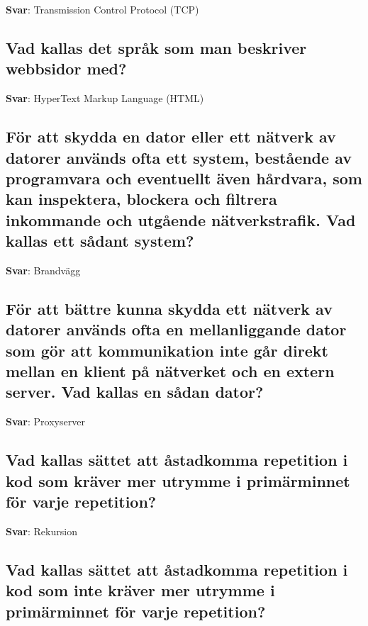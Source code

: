 \documentclass[a4paper,11pt,oneside]{article}
\begin{document}
\begin{sloppypar}
\label{q:26:sa:sv:True}

\textbf{Svar}: Transmission Control Protocol (TCP)



\subsection{Vad kallas det spr\r{a}k som man beskriver webbsidor med?}

\label{q:27:sa:sv:True}

\textbf{Svar}: HyperText Markup Language (HTML)



\subsection{F\"or att skydda en dator eller ett n\"atverk av datorer anv\"ands ofta ett system, best\r{a}ende av programvara och eventuellt \"aven h\r{a}rdvara, som kan inspektera, blockera och filtrera inkommande och utg\r{a}ende n\"atverkstrafik. Vad kallas ett s\r{a}dant system?}

\label{q:28:sa:sv:True}

\textbf{Svar}: Brandv\"agg



\subsection{F\"or att b\"attre kunna skydda ett n\"atverk av datorer anv\"ands ofta en mellanliggande dator som g\"or att kommunikation inte g\r{a}r direkt mellan en klient p\r{a} n\"atverket och en extern server. Vad kallas en s\r{a}dan dator?}

\label{q:29:sa:sv:True}

\textbf{Svar}: Proxyserver



\subsection{Vad kallas s\"attet att \r{a}stadkomma repetition i kod som kr\"aver mer utrymme i prim\"arminnet f\"or varje repetition?}

\label{q:31:sa:sv:True}

\textbf{Svar}: Rekursion



\subsection{Vad kallas s\"attet att \r{a}stadkomma repetition i kod som inte kr\"aver mer utrymme i prim\"arminnet f\"or varje repetition?}


\end{sloppypar}
\end{document}

